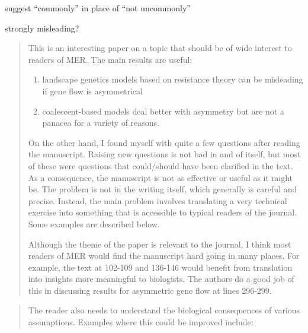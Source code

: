 
\begin{point}{\revref}
     suggest ``commonly'' in place of ``not uncommonly''
\end{point}


\begin{point}{\revref}
     strongly misleading?
\end{point}




\begin{quote}
    This is an interesting paper on a topic that should be of wide interest to
    readers of MER.  The main results are useful: 
    \begin{enumerate}
        \item      landscape genetics models based on resistance theory can be
            misleading if gene flow is asymmetrical
        \item      coalescent-based models deal better with asymmetry but are
            not a panacea for a variety of reasons.
    \end{enumerate}
    On the other hand, I found myself with quite a few questions after reading
    the manuscript.  Raising new questions is not bad in and of itself, but
    most of these were questions that could/should have been clarified in the
    text.  As a consequence, the manuscript is not as effective or useful as it
    might be.  The problem is not in the writing itself, which generally is
    careful and precise.  Instead, the main problem involves translating a very
    technical exercise into something that is accessible to typical readers of
    the journal.  Some examples are described below.

    Although the theme of the paper is relevant to the journal, I think most
    readers of MER would find the manuscript hard going in many places.  For
    example, the text at 102-109 and 136-146 would benefit from translation
    into insights more meaningful to biologists.  The authors do a good job of
    this in discussing results for asymmetric gene flow at lines 296-299.
\end{quote}

\begin{quote}
    The reader also needs to understand the biological consequences of various
    assumptions.  Examples  where this could be improved include:
\end{quote}

